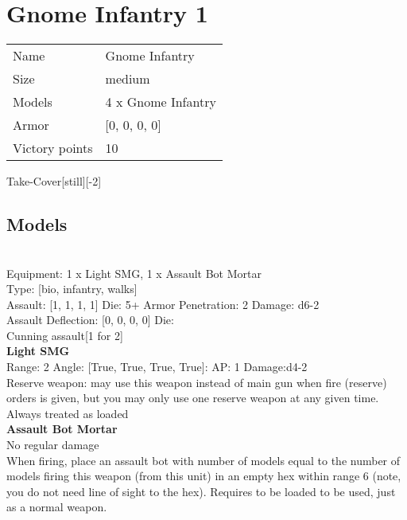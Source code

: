 \pagebreak\pagebreak

\section{ Gnome Infantry 1 }

\begin{tabular}{ll}
  Name & Gnome Infantry \\
  Size & medium\\
  Models & 4 x Gnome Infantry\\
  Armor & [0, 0, 0, 0]\\
  Victory points & 10\\
\end{tabular}

Take-Cover[still][-2]\\ 


\subsection{ Models }

 \\
Equipment: 1 x Light SMG, 1 x Assault Bot Mortar \\
Type: [bio, infantry, walks] \\

Assault: [1, 1, 1, 1] Die: 5+ Armor Penetration: 2 Damage: d6-2 \\
Assault Deflection: [0, 0, 0, 0] Die: \\
\indent Cunning assault[1 for 2]\\ 
 



{\bf Light SMG } \\



Range: 2  Angle: [True, True, True, True]: AP: 1 Damage:d4-2 \\
Reserve weapon: may use this weapon instead of main gun when fire (reserve) orders is given, but you may only use one reserve weapon at any given time.\\ 
Always treated as loaded\\ 




{\bf Assault Bot Mortar } \\

No regular damage\\ 
When firing, place an assault bot with number of models equal to the number of models firing this weapon (from this unit) in an empty hex within range 6 (note, you do not need line of sight to the hex). Requires to be loaded to be used, just as a normal weapon.\\ 






